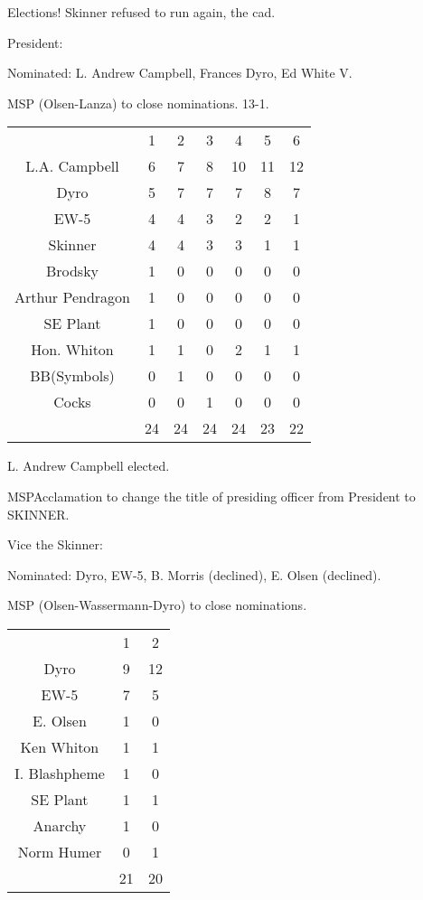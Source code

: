 \documentclass[12pt]{article}
\begin{document}
Elections! Skinner refused to run again, the cad.

President:

Nominated: L. Andrew Campbell, Frances Dyro, Ed White V.

MSP (Olsen-Lanza) to close nominations. 13-1.

\begin{center}
\begin{tabular}{ c c c c c c c }
  & 1 & 2 & 3 & 4 & 5 & 6 \\ 
 L.A. Campbell & 6 & 7 & 8 & 10 & 11 & 12 \\
 Dyro & 5 & 7 & 7 & 7 & 8 & 7 \\
 EW-5 & 4 & 4 & 3 & 2 & 2 & 1 \\
 Skinner & 4 & 4 & 3 & 3 & 1 & 1 \\
 Brodsky & 1 & 0 & 0 & 0 & 0 & 0 \\
 Arthur Pendragon & 1 & 0 & 0 & 0 & 0 & 0 \\
 SE Plant & 1 & 0 & 0 & 0 & 0 & 0 \\
 Hon. Whiton & 1 & 1 & 0 & 2 & 1 & 1 \\
 BB(Symbols) & 0 & 1 & 0 & 0 & 0 & 0 \\
 Cocks & 0 & 0 & 1 & 0 & 0 & 0 \\
  & 24 & 24 & 24 & 24 & 23 & 22 \\ 
\end{tabular}
\end{center}

L. Andrew Campbell elected.

MSPAcclamation to change the title of presiding officer from President to SKINNER.

Vice the Skinner:

Nominated: Dyro, EW-5, B. Morris (declined), E. Olsen (declined).

MSP (Olsen-Wassermann-Dyro) to close nominations.

\begin{center}
\begin{tabular}{ c c c }
  & 1 & 2 \\ 
 Dyro & 9 & 12 \\
 EW-5 & 7 & 5 \\
 E. Olsen & 1 & 0 \\
 Ken Whiton & 1 & 1 \\
 I. Blashpheme & 1 & 0 \\
 SE Plant & 1 & 1 \\
 Anarchy & 1 & 0 \\
 Norm Humer & 0 & 1 \\
  & 21 & 20 \\ 
\end{tabular}
\end{center}
\end{document}
